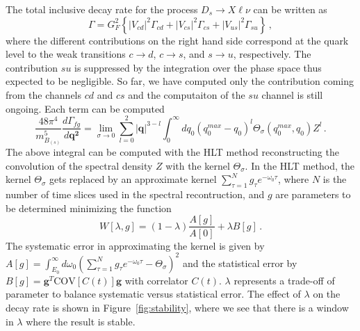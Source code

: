 \documentclass [a4paper, 11pt]{article}
\begin{document}
The total inclusive decay rate for the
process $D_s \to X\ell\nu$ can be written as
\begin{equation}
	\Gamma = G^2_F\left\{ |V_{cd} |^2 \Gamma_{cd} + |V_{cs} |^2 \Gamma_{cs} + |V_{us} |^2 \Gamma_{su}
	\right\}\,,
\end{equation}
where the different contributions on the right hand side correspond at the quark level to the weak
transitions $c \to d$, $c \to s$, and $s \to u$, respectively.
The contribution $su$ is suppressed by the integration over the phase
space thus expected to be negligible. So far, we have computed only
the contribution coming from the channels $cd$ and $cs$ and the
computaiton of the $su$ channel is still ongoing.
Each term can be computed
\begin{equation}
	\frac{48 \pi^4}{m_{B_{(s)}}^5}\frac{d\Gamma_{fg}}{d \bm{ q^2} }
	=\lim_{\sigma\to 0}\sum_{l=0}^2 |\bm{q}|^{3-l}\int_0^{\infty}d q_0 (q^{max}_0-q_0)^l\Theta_\sigma(q_0^{max},q_0) Z^l\,.
	\label{eq:gamma}
\end{equation}
The above integral can be computed with the HLT method \cite{Hansen:2019idp} reconstructing the
convolution of the spectral
density $Z$  with the kernel $\Theta_\sigma$.
In the HLT method, the kernel $\Theta_\sigma$ gets replaced by an
approximate kernel $\sum_{\tau=1}^Ng_\tau e^{-\omega_0\tau}$, where
$N$ is the number of time slices used in the spectral recontruction,
and $g$ are parameters to be determined minimizing the function 
\begin{equation}
  W[\lambda, g]=(1-\lambda)\frac{A[g]}{A[0]}+\lambda B[g]\,.
  \label{eq:W_HLT}
\end{equation}
The systematic error in approximating the kernel is given by
$A[g]=\int_{E_0}^\infty d \omega_0( \sum_{\tau=1}^N g_\tau e^{-\omega_0\tau}- \Theta_\sigma )^2$
and the statistical error by $B[g]=\bm{g}^T
\mbox{COV}[C(t)]\bm{g}$ with correlator $C(t)$. $\lambda$ represents a
trade-off of parameter to balance systematic versus statistical
error. The effect of $\lambda$ on the decay rate is shown in
Figure~\ref{fig:stability}, where we see that there is a window in
$\lambda$ where the result is stable. 
\end{document}
